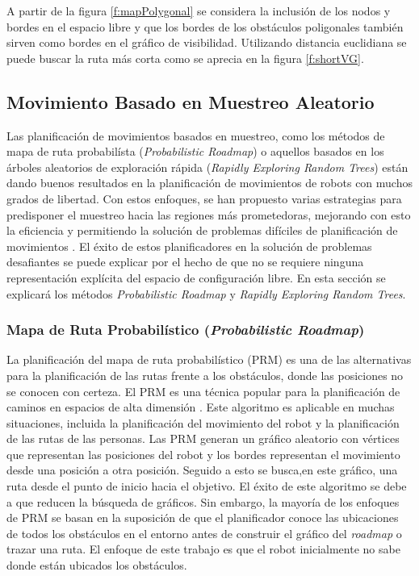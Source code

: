 A partir de la figura \ref{f:mapPolygonal} se considera la inclusi\'on de 
los nodos y bordes en el espacio libre y que los bordes de los obst\'aculos 
poligonales tambi\'en sirven como bordes en el gr\'afico de 
visibilidad. Utilizando distancia euclidiana se puede buscar la ruta m\'as 
corta como se aprecia en la figura \ref{f:shortVG}.

\subsection{Movimiento Basado en Muestreo Aleatorio}

Las planificaci\'on de movimientos basados en muestreo, como los m\'etodos 
de mapa de ruta probabil\'ista (\textit{Probabilistic Roadmap}) o aquellos 
basados en los \'arboles aleatorios de exploraci\'on r\'apida 
(\textit{Rapidly Exploring Random Trees}) est\'an dando buenos resultados 
en la planificaci\'on de movimientos de robots con muchos grados de 
libertad. Con estos enfoques, se han propuesto varias estrategias para 
predisponer el muestreo hacia las regiones m\'as prometedoras, mejorando 
con esto la eficiencia y permitiendo la soluci\'on de problemas dif\'iciles 
de planificaci\'on de movimientos \cite{elbanhawi2014sampling}. El \'exito 
de estos planificadores en la soluci\'on de problemas desafiantes se puede 
explicar por el hecho de que no se requiere ninguna representaci\'on 
expl\'icita del espacio de configuraci\'on libre. En esta secci\'on se 
explicar\'a los m\'etodos \textit{Probabilistic Roadmap} y \textit{Rapidly 
Exploring Random Trees}.

\subsubsection{Mapa de Ruta Probabil\'istico (\textit{Probabilistic Roadmap})}

La planificaci\'on del mapa de ruta probabil\'istico (PRM) es una de las 
alternativas para la planificaci\'on de las rutas frente a los  
obst\'aculos, donde las posiciones no se conocen con certeza. El PRM es una 
t\'ecnica popular para la planificaci\'on de caminos en espacios de alta 
dimensi\'on \cite{guibas1999probabilistic}. Este algoritmo es aplicable 
en muchas situaciones, incluida la planificaci\'on del movimiento del 
robot y la planificaci\'on de las rutas de las personas. Las PRM generan 
un gr\'afico aleatorio con v\'ertices que representan las posiciones del 
robot y los bordes representan el movimiento desde una posici\'on a otra 
posici\'on. Seguido a esto se busca,en este gr\'afico, una ruta desde el 
punto de inicio hacia el objetivo. El \'exito de este algoritmo se debe 
a que reducen la b\'usqueda de gr\'aficos. Sin embargo, la mayor\'ia de 
los enfoques de PRM se basan en la suposici\'on de que el planificador 
conoce las ubicaciones de todos los obst\'aculos en el entorno antes de 
construir el gr\'afico del \textit{roadmap} o trazar una ruta. El enfoque 
de este trabajo es que el robot inicialmente no sabe donde est\'an 
ubicados los obst\'aculos.

